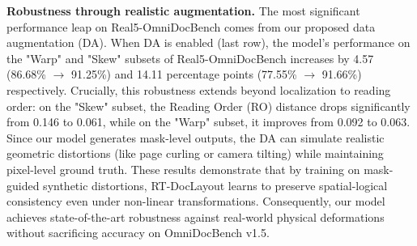 \documentclass[11pt, a4paper,logo,  copyright, nonumbering]{paddleocr}
\begin{document}
\textbf{Robustness through realistic augmentation.}
The most significant performance leap on Real5-OmniDocBench comes from our proposed data augmentation (DA). When DA is enabled (last row), the model's performance on the "Warp" and "Skew" subsets of Real5-OmniDocBench increases by 4.57 (86.68\% $\to$ 91.25\%) and 14.11 percentage points (77.55\% $\to$ 91.66\%) respectively. Crucially, this robustness extends beyond localization to reading order: on the "Skew" subset, the Reading Order (RO) distance drops significantly from 0.146 to 0.061, while on the "Warp" subset, it improves from 0.092 to 0.063. Since our model generates mask-level outputs, the DA can simulate realistic geometric distortions (like page curling or camera tilting) while maintaining pixel-level ground truth. 
These results demonstrate that by training on mask-guided synthetic distortions, RT-DocLayout learns to preserve spatial-logical consistency even under non-linear transformations. Consequently, our model achieves state-of-the-art robustness against real-world physical deformations without sacrificing accuracy on OmniDocBench v1.5.

\end{document}
